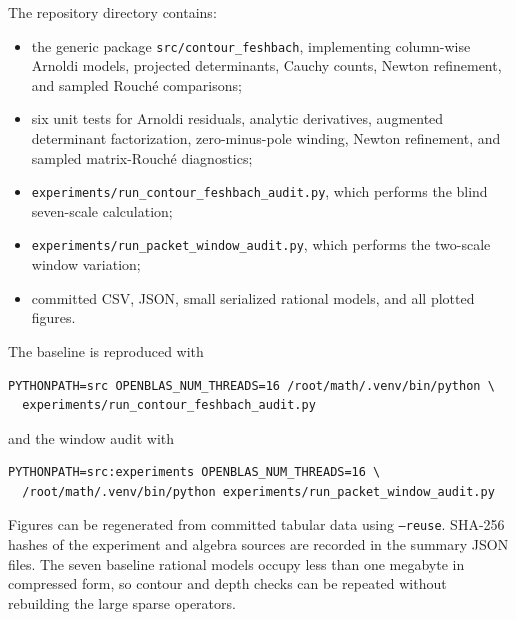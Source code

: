 \documentclass[11pt]{article}
\theoremstyle{definition}
\theoremstyle{remark}
\begin{document}
The repository directory contains:

\begin{itemize}
 \item the generic package \texttt{src/contour\_feshbach}, implementing
 column-wise Arnoldi models, projected determinants, Cauchy counts, Newton
 refinement, and sampled Rouch\'e comparisons;
 \item six unit tests for Arnoldi residuals, analytic derivatives, augmented
 determinant factorization, zero-minus-pole winding, Newton refinement, and
 sampled matrix-Rouch\'e diagnostics;
 \item \texttt{experiments/run\_contour\_feshbach\_audit.py}, which performs
 the blind seven-scale calculation;
 \item \texttt{experiments/run\_packet\_window\_audit.py}, which performs the
 two-scale window variation;
 \item committed CSV, JSON, small serialized rational models, and all plotted
 figures.
\end{itemize}

The baseline is reproduced with
\begin{verbatim}
PYTHONPATH=src OPENBLAS_NUM_THREADS=16 /root/math/.venv/bin/python \
  experiments/run_contour_feshbach_audit.py
\end{verbatim}
and the window audit with
\begin{verbatim}
PYTHONPATH=src:experiments OPENBLAS_NUM_THREADS=16 \
  /root/math/.venv/bin/python experiments/run_packet_window_audit.py
\end{verbatim}
Figures can be regenerated from committed tabular data using \texttt{--reuse}.
SHA-256 hashes of the experiment and algebra sources are recorded in the
summary JSON files.  The seven baseline rational models occupy less than one
megabyte in compressed form, so contour and depth checks can be repeated
without rebuilding the large sparse operators.



\end{document}
